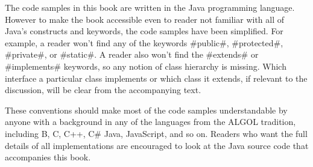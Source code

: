 The code samples in this book are written in the Java programming
language.  However to make the book accessible even to reader not
familiar with all of Java's constructs and keywords, the code samples have
been simplified.  For example, a reader won't find any of the keywords
#public#, #protected#, #private#, or #static#.  A reader also won't
find the #extends# or #implements# keywords, so any notion of class
hierarchy is missing.  Which interface a particular class implements
or which class it extends, if relevant to the discussion, will be clear
from the accompanying text.

These conventions should make most of the code samples understandable by
anyone with a background in any of the languages from the ALGOL tradition,
including B, C, C++, C\# Java, JavaScript, and so on.  Readers who want
the full details of all implementations are encouraged to look at the
Java source code that accompanies this book.


